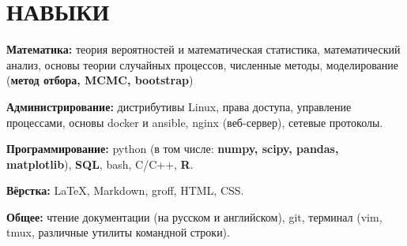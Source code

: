 \section{НАВЫКИ}

\begin{description}

    \setlength\itemsep{-0.4em}

    \item{\bfseries Математика:}
        теория вероятностей и математическая статистика, математический анализ,
        основы теории случайных процессов, численные методы, моделирование
        (\textbf{метод отбора, MCMC, bootstrap})

    \item{\bfseries Администрирование:}
        дистрибутивы Linux, права доступа, управление процессами, основы docker
        и ansible, nginx (веб-сервер), сетевые протоколы.
    
    \item{\bfseries Программирование:}
        python (в том числе: \textbf{numpy, scipy, pandas, matplotlib}), \textbf{SQL}, bash, C/C++, \textbf{R}.
    
    \item{\bfseries Вёрстка:}
        \LaTeX, Markdown, groff, HTML, CSS.

    \item{\bfseries Общее:}
        чтение документации (на русском и английском), git, терминал (vim,
        tmux, различные утилиты командной строки).

\end{description}
    
    \vspace{.7em}
